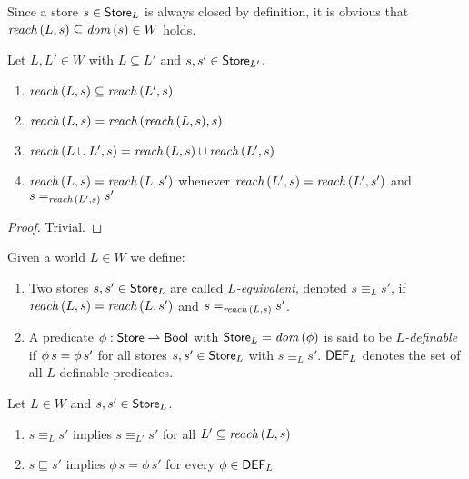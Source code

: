 \documentclass[12pt,a4paper]{report}
\newcommand{\DEF}{\sstyle{DEF}}
\begin{document}
Since a store $s\in\mathsf{Store}_L$ is always closed by definition, it is obvious that
$\mathit{reach}\,(L,s) \subseteq \mathit{dom}\,(s) \in  W$ holds.

\begin{lemma}[Reachability] \label{lemma:Reachability}
  Let $L,L'\in W$ with $L \subseteq L'$ and $s,s'\in\mathsf{Store}_{L'}$.
  \begin{enumerate}
    \item $\mathit{reach}\,(L,s) \subseteq \mathit{reach}\,(L',s)$
    \item $\mathit{reach}\,(L,s) = \mathit{reach}\,(\mathit{reach}\,(L,s),s)$
    \item $\mathit{reach}\,(L \cup L',s) = \mathit{reach}\,(L,s) \cup \mathit{reach}\,(L',s)$
    \item $\mathit{reach}\,(L,s) = \mathit{reach}\,(L,s')$ whenever $\mathit{reach}\,(L',s) = \mathit{reach}\,(L',s')$
          and $s =_{\mathit{reach}\,(L',s)} s'$
  \end{enumerate}
\end{lemma}

\begin{proof}
  Trivial.
\end{proof}

\begin{definition}
  Given a world $L \in W$ we define:
  \begin{enumerate}
    \item Two stores $s,s'\in\mathsf{Store}_L$ are called {\em $L$-equivalent}, denoted $s \equiv_L s'$, if
          $\mathit{reach}\,(L,s) = \mathit{reach}\,(L,s')$ and $s =_{\mathit{reach}\,(L,s)} s'$.

    \item A predicate $\phi:\mathsf{Store} \rightharpoonup \mathsf{Bool}$ with $\mathsf{Store}_L = \mathit{dom}\,(\phi)$ is said to be
          {\em $L$-definable} if $\phi\,s = \phi\,s'$ for all stores
          $s,s'\in\mathsf{Store}_L$ with $s \equiv_L s'$. $\DEF_L$ denotes the set of all $L$-definable
          predicates.
  \end{enumerate}
\end{definition}

\begin{lemma} \label{lemma:L_equivalence_and_L_definability}
  Let $L \in W$ and $s,s' \in \mathsf{Store}_L$.
  \begin{enumerate}
    \item $s \equiv_{L} s'$ implies $s \equiv_{L'} s'$ for all $L' \subseteq \mathit{reach}\,(L,s)$
    \item $s \sqsubseteq s'$ implies $\phi\,s = \phi\,s'$ for every $\phi \in \DEF_L$
  \end{enumerate}
\end{lemma}
\end{document}

